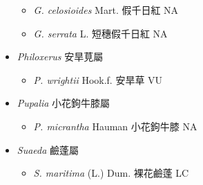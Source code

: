 \begin{itemize}
  \begin{itemize}
        \item[] \textit{G. celosioides} Mart.  假千日紅   NA
        \item[] \textit{G. serrata} L.  短穗假千日紅   NA
  \end{itemize}
 \item[] \textit{Philoxerus} 安旱莧屬
                                
  \begin{itemize}
        \item[] \textit{P. wrightii} Hook.f.  安旱草   VU
  \end{itemize}
 \item[] \textit{Pupalia} 小花鉤牛膝屬
                                
  \begin{itemize}
        \item[] \textit{P. micrantha} Hauman  小花鉤牛膝   NA
  \end{itemize}
 \item[] \textit{Suaeda} 鹼蓬屬
                                
  \begin{itemize}
        \item[] \textit{S. maritima} (L.) Dum.  裸花鹼蓬   LC
  \end{itemize}
  \end{itemize}
